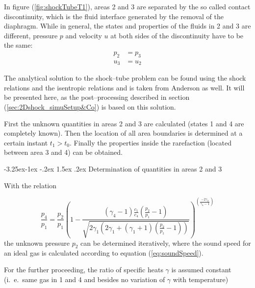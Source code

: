 \documentclass[11pt,a4paper,twoside]{report}
\makeatletter
\renewcommand\paragraph{\@startsection{paragraph}{4}{\z@}%
  {-3.25ex\@plus -1ex \@minus -.2ex}%
  {1.5ex \@plus .2ex}%
  {\normalfont\normalsize\bfseries}}
\makeatother
\begin{document}
In figure (\ref{fig:shockTubeT1}), areas 2 and 3 are separated by the so called contact discontinuity, which is the fluid interface generated by the removal of the diaphragm. While in general, the states and properties of the fluids in 2 and 3 are different, pressure $p$ and velocity $u$ at both sides of the discontinuity have to be the same:
\begin{equation}
\begin{split}
\label{eq:condCD}
p_2&=p_3\\
u_3&=u_2
\end{split}
\end{equation}

The analytical solution to the shock--tube problem can be found using the shock relations and the isentropic relations and is taken from Anderson \cite{Anderson2002} as well. 
It will be presented here, as the post--processing described in section (\ref{sec:2Dshock_simuSetup&Co}) is based on this solution.

First the unknown quantities in areas 2 and 3 are calculated (states 1 and 4 are completely known). Then the location of all area boundaries is determined at a certain instant $t_1>t_0$. Finally the properties inside the rarefaction (located between area 3 and 4) can be obtained.

\paragraph{Determination of quantities in areas 2 and 3}

With the relation

\begin{equation}
 \frac{p_4}{p_1} = \frac{p_2}{p_1}  \left(1-\frac{(\gamma_4-1)\frac{c_1}{c_4}\left(\frac{p_2}{p_1}-1\right)}{\sqrt{2\gamma_1\left(2 \gamma_1+(\gamma_1+1)\left(\frac{p_2}{p_1}-1\right)\right)}}\right)^{\left(\frac{-2 \gamma_4}{\gamma_4-1}\right)}
\end{equation}
the unknown pressure $p_2$ can be determined iteratively, where the sound speed for an ideal gas is calculated according to equation (\ref{eq:soundSpeed}). 

For the further proceeding, the ratio of specific heats $\gamma$ is assumed constant (i.\ e.\ same gas in 1 and 4 and besides no variation of $\gamma$ with temperature)
\end{document}
